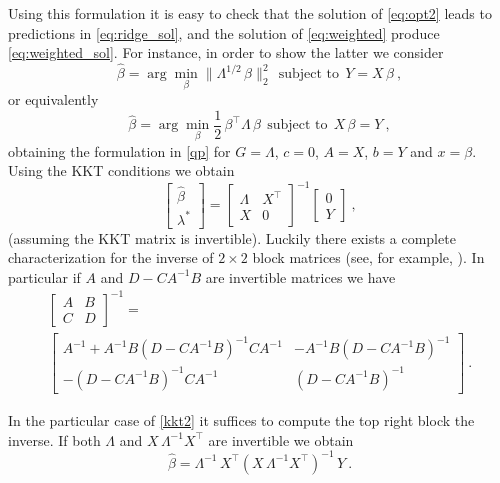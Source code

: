 \documentclass[12pt,letterpaper]{article}
\begin{document}
Using this formulation it is easy to check that the solution of \eqref{eq:opt2} leads to predictions in \eqref{eq:ridge_sol}, and the solution of \eqref{eq:weighted} produce \eqref{eq:weighted_sol}. For instance, in order to show the latter we consider 
\begin{equation} \label{eq:weighted_app}
    \hat{\beta} = \arg\min_\beta \|\Lambda^{1/2}\,\beta\|_2^2 ~~\mbox{subject to}~~ Y = X\,\beta
    ~,
\end{equation}
or equivalently 
\begin{equation}
    \hat{\beta} = \arg\min_\beta \frac{1}{2}\,\beta^\top \Lambda\,\beta ~~\mbox{subject to}~~  X\,\beta = Y
    ~,
\end{equation}
obtaining the formulation in \eqref{qp} for $G=\Lambda$, $c=0$, $A=X$, $b=Y$ and $x=\beta$. Using the KKT conditions we obtain
\begin{equation}
    \left[
    \begin{matrix}
    \hat \beta \\ 
    \lambda^*
    \end{matrix}\right] =
    \left[
    \begin{matrix}
    \Lambda & X^\top \\ 
    X & 0
    \end{matrix}\right]^{-1}
    \left[
    \begin{matrix}
    0 \\ 
    Y
    \end{matrix}\right]
    ~,
    \label{kkt2}
\end{equation}
(assuming the KKT matrix is invertible). Luckily there exists a complete characterization for the inverse of $2\times 2$ block matrices (see, for example, \citealt{lu2002inverses}). In particular if $A$ and $D - CA^{-1}B$ are invertible matrices we have
\begin{multline} 
 {\begin{bmatrix}  {A} &   {B} \\  {C} &  {D} \end{bmatrix}}^{-1}= \\ {\begin{bmatrix}  {A} ^{-1}+  {A} ^{-1}  {B} \left(  {D} -  {CA} ^{-1}  {B} \right)^{-1}  {CA} ^{-1}& -  {A} ^{-1}  {B} \left(  {D} -  {CA} ^{-1}  {B} \right)^{-1}\\-\left(  {D} -  {CA} ^{-1}  {B} \right)^{-1}  {CA} ^{-1}& \left(  {D} -  {CA} ^{-1}  {B} \right)^{-1}\end{bmatrix}}
 ~.
\end{multline}

In the particular case of \eqref{kkt2} it suffices to compute the top right block the inverse. If both $\Lambda$ and $X\,\Lambda^{-1}X^\top$ are invertible we obtain 
\begin{equation}
    \hat \beta = \Lambda^{-1}\,X^\top(X\,\Lambda^{-1}X^\top)^{-1}\,Y
    ~. 
\end{equation}

{\raggedright
\setlength{\bibsep}{0pt plus 0.3ex} %


}
\end{document}
